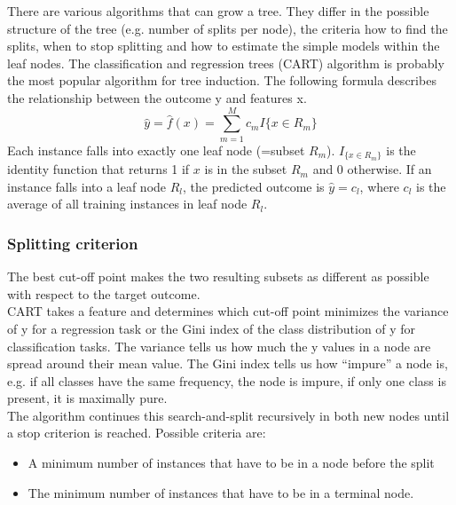 There are various algorithms that can grow a tree. They differ in the possible structure of the tree (e.g. number of splits per node), the criteria how to find the splits, when to stop splitting and how to estimate the simple models within the leaf nodes. The classification and regression trees (CART) algorithm is probably the most popular algorithm for tree induction.
The following formula describes the relationship between the outcome y and features x.
\begin{equation*}
    \hat{y}=\hat{f}(x)=\sum_{m=1}^Mc_m{}I\{x\in{}R_m\}
\end{equation*}
Each instance falls into exactly one leaf node (=subset $R_m$). $I_{\{x\in{}R_m\}}$ is the identity function that returns 1 if $x$ is in the subset $R_m$ and 0 otherwise. If an instance falls into a leaf node $R_l$, the predicted outcome is $\hat{y}=c_l$, where $c_l$ is the average of all training instances in leaf node $R_l$.

\subsubsection{Splitting criterion}
The best cut-off point makes the two resulting subsets as different as possible with respect to the target outcome.\\
CART takes a feature and determines which cut-off point minimizes the variance of y for a regression task or the Gini index of the class distribution of y for classification tasks. The variance tells us how much the y values in a node are spread around their mean value. The Gini index tells us how “impure” a node is, e.g. if all classes have the same frequency, the node is impure, if only one class is present, it is maximally pure.\\

The algorithm continues this search-and-split recursively in both new nodes until a stop
criterion is reached. Possible criteria are:
\begin{itemize}
    \item A minimum number of instances that have to be in a node before the split
    \item The minimum number of instances that have to be in a terminal node.
\end{itemize}

